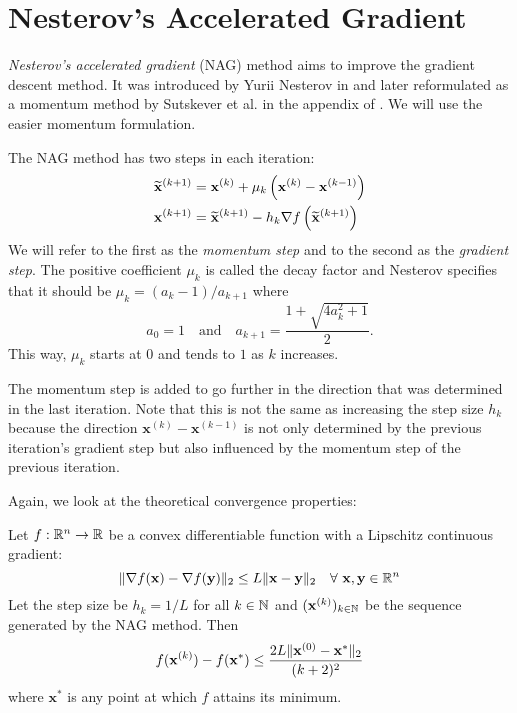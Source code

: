 \section{Nesterov's Accelerated Gradient} \label{sec:nesterovs_accelerated_gradient}

\emph{Nesterov's accelerated gradient} (NAG) method aims to improve the gradient descent method.
It was introduced by Yurii Nesterov in \cite{Nesterov-NesterovAcceleratedGradient}
and later reformulated as a momentum method by Sutskever et al. in the appendix of \cite{SutskeverMartensDahlHinten-MomentumInDeepLearning}.
We will use the easier momentum formulation.

The NAG method has two steps in each iteration:
\begin{align*}
 \widetilde{\mathbf{x}}^{(k+1)} &= \mathbf{x}^{(k)} + \mu_k \left({ \mathbf{x}^{(k)} - \mathbf{x}^{(k-1)} }\right) \\
 \mathbf{x}^{(k+1)}             &= \widetilde{\mathbf{x}}^{(k+1)} - h_k \nabla f \left({ \widetilde{\mathbf{x}}^{(k+1)} }\right)
\end{align*}
We will refer to the first as the \emph{momentum step} and to the second as the \emph{gradient step}.
The positive coefficient \(\mu_k\) is called the decay factor and Nesterov specifies that it should be \(\mu_k = (a_k - 1)/a_{k+1}\) where
\[ a_0 = 1 \quad \text{and} \quad a_{k+1} = \frac{1 + \sqrt{4 a_k^2 + 1}}{2}. \]
This way, \(\mu_k\) starts at \(0\) and tends to \(1\) as \(k\) increases.

The momentum step is added to go further in the direction that was determined in the last iteration.
Note that this is not the same as increasing the step size \(h_k\) because the direction \(\mathbf{x}^{(k)} - \mathbf{x}^{(k-1)}\)
is not only determined by the previous iteration's gradient step but also influenced by the momentum step of the previous iteration.

Again, we look at the theoretical convergence properties:
\begin{theorem} \label{thm:nesterovs_accelerated_gradient_converges}
 Let \(f: \mathbb{R}^n \to \mathbb{R}\) be a convex differentiable function with a Lipschitz continuous gradient:
 \[ \lVert \nabla f(\mathbf{x}) - \nabla f(\mathbf{y}) \rVert_2 \leq L \lVert\mathbf{x} - \mathbf{y}\rVert_2 \quad \forall \ \mathbf{x}, \mathbf{y} \in \mathbb{R}^n\]
 Let the step size be \(h_k = 1/L\) for all \(k \in \mathbb{N}\)
 and \((\mathbf{x}^{(k)})_{k \in \mathbb{N}}\) be the sequence generated by the NAG method.
 Then
 \[ f(\mathbf{x}^{(k)}) - f(\mathbf{x}^*) \leq \frac{2 L \lVert\mathbf{x}^{(0)} - \mathbf{x}^*\rVert_2}{(k + 2)^2} \]
 where \(\mathbf{x}^*\) is any point at which \(f\) attains its minimum.
\end{theorem}

